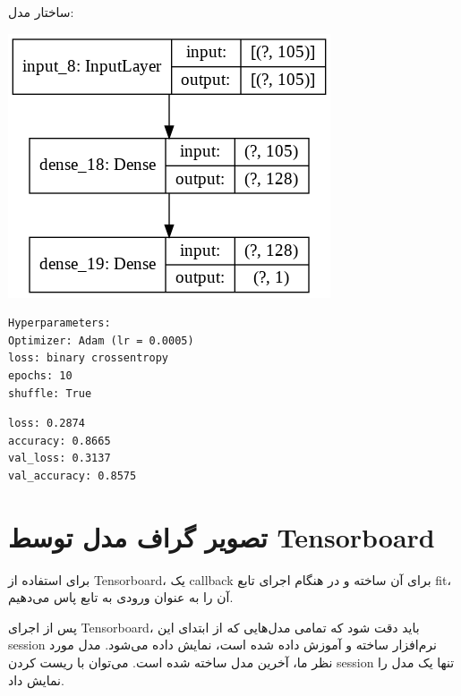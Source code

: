 \documentclass{article}
\begin{document}
ساختار مدل:



\begin{center}
	\includegraphics[scale=0.45]{model.png} 
\end{center}    



\begin{latin}
\begin{lstlisting}
Hyperparameters:
Optimizer: Adam (lr = 0.0005)
loss: binary crossentropy
epochs: 10
shuffle: True
\end{lstlisting}
\end{latin}


\begin{latin}
\begin{lstlisting}
loss: 0.2874
accuracy: 0.8665
val_loss: 0.3137
val_accuracy: 0.8575
\end{lstlisting}
\end{latin}


\section{
تصویر گراف مدل توسط Tensorboard
}

برای استفاده از Tensorboard، یک callback برای آن ساخته و در هنگام اجرای تابع fit، آن را به عنوان ورودی به تابع پاس می‌دهیم.

پس از اجرای Tensorboard، باید دقت شود که تمامی مدل‌هایی که از ابتدای این session نرم‌افزار  ساخته و آموزش داده شده است،‌ نمایش داده ‌می‌شود. مدل مورد نظر ما، آخرین مدل ساخته شده است. می‌توان با ریست کردن session تنها یک مدل را نمایش داد.
\end{document}
